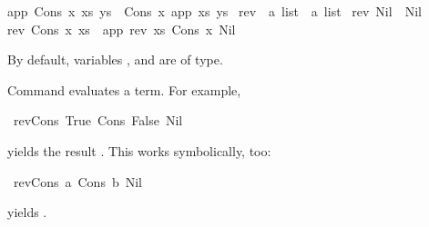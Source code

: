 \begin{isabellebody}
{}app\ {}Cons\ x\ xs{}\ ys\ {}\ Cons\ x\ {}app\ xs\ ys{}{}\isanewline
\isanewline
{}\isamarkupfalse%
\ rev\ {}{}\ {}{}a\ list\ {}\ {}a\ list{}\ \isanewline
{}rev\ Nil\ {}\ Nil{}\ {}\isanewline
{}rev\ {}Cons\ x\ xs{}\ {}\ app\ {}rev\ xs{}\ {}Cons\ x\ Nil{}{}%
\begin{isamarkuptext}%
By default, variables ,  and  are of
 type.

Command  evaluates a term. For example,%
\end{isamarkuptext}%
\isamarkuptrue%
\isamarkupfalse%
\ {}rev{}Cons\ True\ {}Cons\ False\ Nil{}{}{}%
\begin{isamarkuptext}%
yields the result . This works symbolically, too:%
\end{isamarkuptext}%
\isamarkuptrue%
\isamarkupfalse%
\ {}rev{}Cons\ a\ {}Cons\ b\ Nil{}{}{}%
\begin{isamarkuptext}%
yields .
\medskip


\end{isamarkuptext}
\end{isabellebody}
